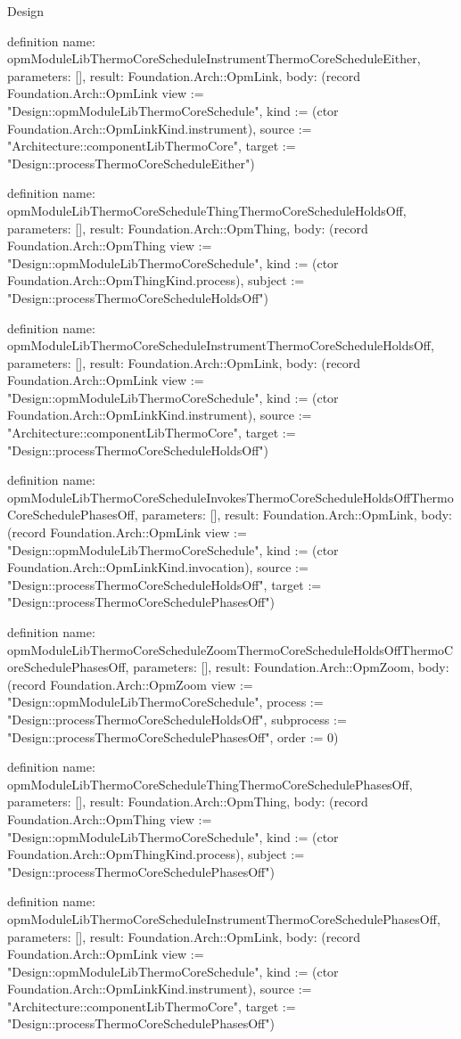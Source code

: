 \begin{lexlean}{Design}
\begin{semanticmodule}
definition{
  name: opmModuleLibThermoCoreScheduleInstrumentThermoCoreScheduleEither,
  parameters: [],
  result: Foundation.Arch::OpmLink,
  body: (record Foundation.Arch::OpmLink {view := "Design::opmModuleLibThermoCoreSchedule", kind := (ctor Foundation.Arch::OpmLinkKind.instrument), source := "Architecture::componentLibThermoCore", target := "Design::processThermoCoreScheduleEither"})
}

definition{
  name: opmModuleLibThermoCoreScheduleThingThermoCoreScheduleHoldsOff,
  parameters: [],
  result: Foundation.Arch::OpmThing,
  body: (record Foundation.Arch::OpmThing {view := "Design::opmModuleLibThermoCoreSchedule", kind := (ctor Foundation.Arch::OpmThingKind.process), subject := "Design::processThermoCoreScheduleHoldsOff"})
}

definition{
  name: opmModuleLibThermoCoreScheduleInstrumentThermoCoreScheduleHoldsOff,
  parameters: [],
  result: Foundation.Arch::OpmLink,
  body: (record Foundation.Arch::OpmLink {view := "Design::opmModuleLibThermoCoreSchedule", kind := (ctor Foundation.Arch::OpmLinkKind.instrument), source := "Architecture::componentLibThermoCore", target := "Design::processThermoCoreScheduleHoldsOff"})
}

definition{
  name: opmModuleLibThermoCoreScheduleInvokesThermoCoreScheduleHoldsOffThermoCoreSchedulePhasesOff,
  parameters: [],
  result: Foundation.Arch::OpmLink,
  body: (record Foundation.Arch::OpmLink {view := "Design::opmModuleLibThermoCoreSchedule", kind := (ctor Foundation.Arch::OpmLinkKind.invocation), source := "Design::processThermoCoreScheduleHoldsOff", target := "Design::processThermoCoreSchedulePhasesOff"})
}

definition{
  name: opmModuleLibThermoCoreScheduleZoomThermoCoreScheduleHoldsOffThermoCoreSchedulePhasesOff,
  parameters: [],
  result: Foundation.Arch::OpmZoom,
  body: (record Foundation.Arch::OpmZoom {view := "Design::opmModuleLibThermoCoreSchedule", process := "Design::processThermoCoreScheduleHoldsOff", subprocess := "Design::processThermoCoreSchedulePhasesOff", order := 0})
}

definition{
  name: opmModuleLibThermoCoreScheduleThingThermoCoreSchedulePhasesOff,
  parameters: [],
  result: Foundation.Arch::OpmThing,
  body: (record Foundation.Arch::OpmThing {view := "Design::opmModuleLibThermoCoreSchedule", kind := (ctor Foundation.Arch::OpmThingKind.process), subject := "Design::processThermoCoreSchedulePhasesOff"})
}

definition{
  name: opmModuleLibThermoCoreScheduleInstrumentThermoCoreSchedulePhasesOff,
  parameters: [],
  result: Foundation.Arch::OpmLink,
  body: (record Foundation.Arch::OpmLink {view := "Design::opmModuleLibThermoCoreSchedule", kind := (ctor Foundation.Arch::OpmLinkKind.instrument), source := "Architecture::componentLibThermoCore", target := "Design::processThermoCoreSchedulePhasesOff"})
}


\end{semanticmodule}
\end{lexlean}
